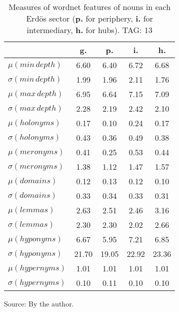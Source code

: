 \begin{table}[h!]
\begin{center}
	\caption{Measures of wordnet features of nouns in each Erd\"os sector ({{\bf p.}} for periphery, {{\bf i.}} for intermediary, {{\bf h.}} for hubs). TAG: 13}\label{tab:wnn}
\begin{tabular}{l || c | c | c | c}\hline
 & {\bf g.} & {\bf p.} & {\bf i.} & {\bf h.} \\\hline\hline
$\mu(min\,depth)$ & 6.60  & 6.40  & 6.72  & 6.68 \\
$\sigma(min\,depth)$ & 1.99  & 1.96  & 2.11  & 1.76 \\\hline
$\mu(max\,depth)$ & 6.95  & 6.64  & 7.15  & 7.09 \\
$\sigma(max\,depth)$ & 2.28  & 2.19  & 2.42  & 2.10 \\\hline
$\mu(holonyms)$ & 0.17  & 0.10  & 0.24  & 0.17 \\
$\sigma(holonyms)$ & 0.43  & 0.36  & 0.49  & 0.38 \\\hline
$\mu(meronyms)$ & 0.41  & 0.25  & 0.53  & 0.44 \\
$\sigma(meronyms)$ & 1.38  & 1.12  & 1.47  & 1.57 \\\hline
$\mu(domains)$ & 0.12  & 0.13  & 0.12  & 0.10 \\
$\sigma(domains)$ & 0.33  & 0.34  & 0.33  & 0.31 \\\hline
$\mu(lemmas)$ & 2.63  & 2.51  & 2.46  & 3.16 \\
$\sigma(lemmas)$ & 2.30  & 2.30  & 2.02  & 2.66 \\\hline
$\mu(hyponyms)$ & 6.67  & 5.95  & 7.21  & 6.85 \\
$\sigma(hyponyms)$ & 21.70  & 19.05  & 22.92  & 23.36 \\\hline
$\mu(hypernyms)$ & 1.01  & 1.01  & 1.01  & 1.01 \\
$\sigma(hypernyms)$ & 0.10  & 0.11  & 0.10  & 0.10 \\\hline
\end{tabular}
\begin{flushleft}\footnotesize
		Source: By the author.\
\end{flushleft}
\end{center}
\end{table}
